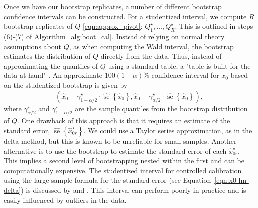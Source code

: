 \documentclass[cmfont,usenames,dvipsnames,leqno]{afit-etd}\usepackage[]{graphicx}\usepackage[]{color}
\newcommand{\boot}{\star} %
\newcommand{\wh}[1]{\ensuremath{\widehat{#1}}}
\newcommand{\se}{\operatorname{se}}
\begin{document}
Once we have our bootstrap replicates, a number of different bootstrap confidence intervals can be constructed. For a studentized interval, we compute $R$ bootstrap replicates of $Q$ \eqref{eqn:approx_pivot}: $Q_1^\boot, \dotsc, Q_R^\boot$. This is outlined in steps (6)-(7) of Algorithm~\ref{alg:boot_cal}. Instead of relying on normal theory assumptions about $Q$, as when computing the Wald interval, the bootstrap estimates the distribution of $Q$ directly from the data. Thus, instead of approximating the quantiles of $Q$ using a standard table, a "table is built for the data at hand" \citep{efron_boot_1994}. An approximate $100(1 - \alpha)\%$ confidence interval for $x_0$ based on the studentized bootstrap is given by
\begin{equation}
\label{eqn:student_int}
  \left( \wh{x}_0 - \gamma_{1-\alpha/2}^\boot \cdot \wh{\se}\left\{\wh{x}_0\right\}, \wh{x}_0 - \gamma_{\alpha/2}^\boot \cdot \wh{\se}\left\{\wh{x}_0\right\} \right),
\end{equation}
where $\gamma_{\alpha/2}^\boot$ and $\gamma_{1 - \alpha/2}^\boot$ are the sample quantiles from the bootstrap distribution of $Q$. One drawback of this approach is that it requires an estimate of the standard error, $\wh{\se}\left\{\wh{x}_{0r}^\boot\right\}$. We could use a Taylor series approximation, as in the delta method, but this is known to be unreliable for small samples. Another alternative is to use the bootstrap to estimate the standard error of each $\wh{x}_{0r}^\boot$. This implies a second level of bootstrapping nested within the first and can be computationally expensive. The studentized interval for controlled calibration using the large-sample formula for the standard error (see Equation~\eqref{eqn:x0-lm-delta}) is discussed by \citet{zeng_bootstrap-adjusted_1997} and  \citet{jones_bootstrapping_1999}. This interval can perform poorly in practice and is easily influenced by outliers in the data. 
\end{document}
